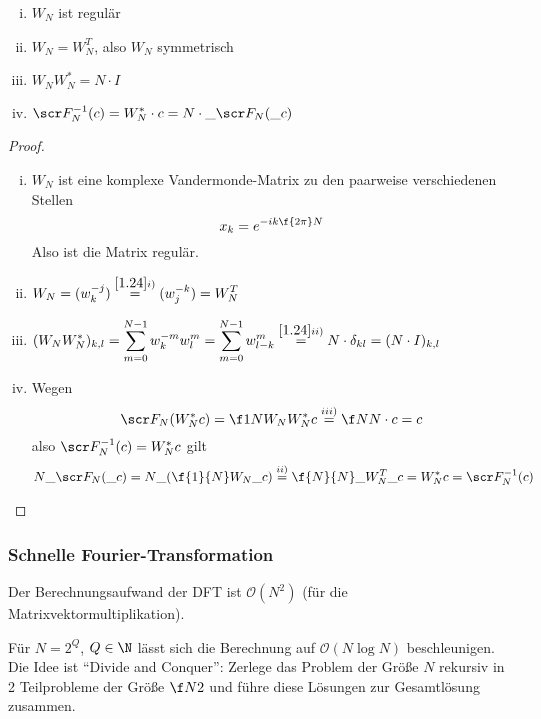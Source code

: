 \documentclass[11pt]{scrartcl}
\begin{document}
\begin{lem}[Eigenschaften] \label{1.27}
	\begin{enumerate}[i)]
		\item
			$\displaystyle W_N$ ist regulär
		\item
			$\displaystyle W_N = W_N^T$, also $W_N$ symmetrisch
		\item
			$\displaystyle W_NW_N^{*} = N\cdot I$
		\item
			$\displaystyle \scr F_N^{-1}(c) = W^*_N\cdot c = N \cdot \_{\scr F_N(\_c)}$
	\end{enumerate}
	\begin{proof}
		\begin{enumerate}[i)]
			\item
				$W_N$ ist eine komplexe Vandermonde-Matrix zu den paarweise verschiedenen Stellen
				\[
					x_k = e^{-ik\f {2\pi}N}
				\]
				Also ist die Matrix regulär.
			\item
				$\displaystyle W_N = (w_k^{-j}) \stackrel{\ref{1.24} i)}=  (w_j^{-k}) = W_N^T$
			\item
				$\displaystyle (W_NW_N^*)_{k,l} = \sum_{m=0}^{N-1} w_k^{-m}w_l^m = \sum_{m=0}^{N-1} w_{l-k}^m \stackrel{\ref{1.24} ii)}= N\cdot \delta_{kl} = (N\cdot I)_{k,l}$
			\item
				Wegen
				\[
					\scr F_N (W_N^* c) = \f 1N W_N W_N^* c \stackrel{iii)}= \f N N \cdot c = c
				\]
				also $\scr F_N^{-1} (c) = W_N^* c$ gilt
				\[
					N \_{\scr F_N(\_c)}
					= N \_{\left(\f {1}{N} W_N \_c\right)} 
					\stackrel{ii)}= \f{N}{N} \_{W_N^T \_c} 
					= W_N^* c 
					= \scr F_N^{-1}(c)
				\]
		\end{enumerate}
	\end{proof}
\end{lem}


\subsubsection{Schnelle Fourier-Transformation}

Der Berechnungsaufwand der DFT ist $\mathcal O(N^2)$ (für die Matrixvektormultiplikation).

Für $N=2^Q$, $Q\in \N$ lässt sich die Berechnung auf $\mathcal O(N\log N)$ beschleunigen.
Die Idee ist “Divide and Conquer”: Zerlege das Problem der Größe $N$ rekursiv in 2 Teilprobleme der Größe $\f N2$ und führe diese Lösungen zur Gesamtlösung zusammen.
\end{document}
